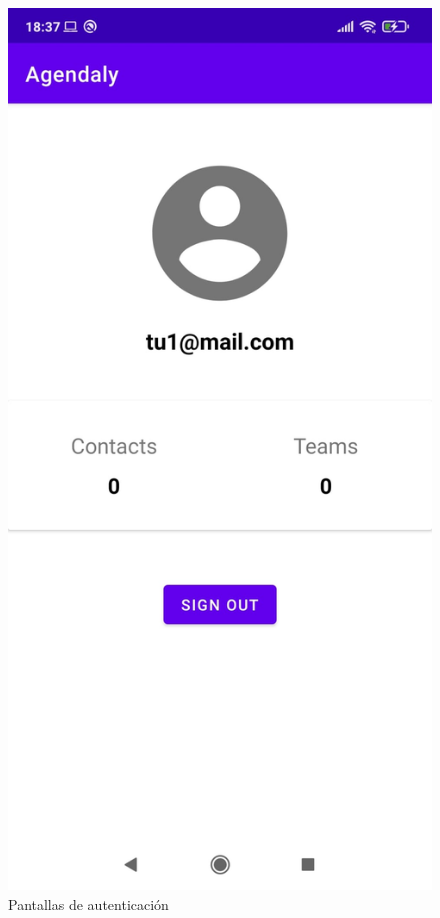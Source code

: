 \documentclass[a4paper,openright,12pt]{article}
\begin{document}
\begin{figure}
            \includegraphics[scale=0.05]{account_view.jpeg}
            \caption{Pantallas de autenticación}
        \end{figure}
        
\end{document}
